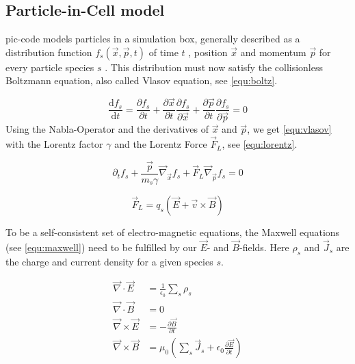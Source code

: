 \documentclass[bachelor_thesis]{subfiles}
\begin{document}
\subsection{Particle-in-Cell model} \label{chap:pic}
\Gls{pic}-code models particles in a simulation box, generally described as a distribution function $f_s(\vec{x}, \vec{p}, t)$ of time $t$ , position $\vec{x}$ and momentum $\vec{p}$ for every particle species $s$ \cite{PICrepo}.
This distribution must now satisfy the collisionless Boltzmann equation, also called Vlasov equation\cite{Vlasov1968}, see \autoref{equ:boltz}.

\begin{equation}
	\frac{\mathrm{d}f_s}{\mathrm{d}t}=\frac{\partial f_s}{\partial t} + \frac{\partial \vec{x}}{\partial t} \frac{\partial f_s}{\partial \vec{x}} + \frac{\partial \vec{p}}{\partial t} \frac{\partial f_s}{\partial \vec{p}} = 0
	\label{equ:boltz}
\end{equation}
Using the Nabla-Operator and the derivatives of $\vec{x}$ and $\vec{p}$, we get \autoref{equ:vlasov} with the Lorentz factor $\gamma$ and the Lorentz Force $\vec{F}_L$, see \autoref{equ:lorentz}.

\begin{equation}
	\partial_t f_s + \frac{\vec{p}}{m_s \gamma} \vec{\nabla}_{\vec{x}} f_s + \vec{F}_L \vec{\nabla}_{\vec{p}} f_s = 0
	\label{equ:vlasov}
\end{equation}

\begin{equation}
	\vec{F}_L=q_s\left(\vec{E}+\vec{v}\times\vec{B}\right)
	\label{equ:lorentz}
\end{equation}

To be a self-consistent set of electro-magnetic equations, the Maxwell equations (see \autoref{equ:maxwell}) need to be fulfilled by our $\vec{E}$- and $\vec{B}$-fields. Here $\rho_s$ and $\vec{J}_s$ are the charge and current density for a given species $s$.

\begin{equation}
\begin{aligned}
	\vec{\nabla}\cdot\vec{E}  &= \frac{1}{\epsilon_0}\sum_s \rho_s 									\\
	\vec{\nabla}\cdot\vec{B}  &= 0 														\\
	\vec{\nabla}\times\vec{E} &= -\frac{\partial \vec{B}}{\partial t}									\\
	\vec{\nabla}\times\vec{B}&= \mu_0 \left(\sum_s \vec{J}_s + \epsilon_0 \frac{\partial \vec{E}}{\partial t}\right)	
\end{aligned}
\label{equ:maxwell}
\end{equation}
\end{document}
